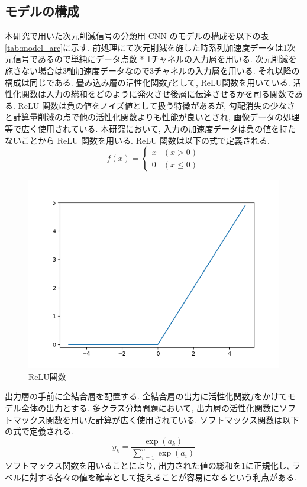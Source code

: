 \subsection{モデルの構成}
本研究で用いた次元削減信号の分類用 CNN のモデルの構成を以下の表\ref{tab:model_arc}に示す. 前処理にて次元削減を施した時系列加速度データは1次元信号であるので単純にデータ点数 * 1チャネルの入力層を用いる. 次元削減を施さない場合は3軸加速度データなので3チャネルの入力層を用いる. それ以降の構成は同じである. 
畳み込み層の活性化関数$f$として, ReLU関数を用いている. 
活性化関数は入力の総和をどのように発火させ後層に伝達させるかを司る関数である. 
ReLU 関数は負の値をノイズ値として扱う特徴があるが, 勾配消失の少なさと計算量削減の点で他の活性化関数よりも性能が良いとされ, 画像データの処理等で広く使用されている. 
本研究において, 入力の加速度データは負の値を持たないことから ReLU 関数を用いる. 
ReLU 関数は以下の式で定義される. 
\begin{equation}
    f(x)=\left\{\begin{array}{ll}x & (x>0) \\ 0 & (x \leq 0)\end{array}\right.
\end{equation}

\begin{figure}[H]
    \begin{center}
    \includegraphics[width=12cm]{eps/relu.png}
    \caption{ReLU関数}
    \label{fig:relu}
   \end{center}
   \end{figure}
   
出力層の手前に全結合層を配置する. 全結合層の出力に活性化関数$f$をかけてモデル全体の出力とする. 
多クラス分類問題において, 出力層の活性化関数にソフトマックス関数を用いた計算が広く使用されている. ソフトマックス関数は以下の式で定義される. 
\begin{equation}
    y_{k}=\displaystyle\frac{\exp \left(a_{k}\right)}{\displaystyle\sum_{i=1}^{n} \exp \left(a_{i}\right)}
\end{equation}
ソフトマックス関数を用いることにより, 出力された値の総和を1に正規化し, ラベルに対する各々の値を確率として捉えることが容易になるという利点がある. 

